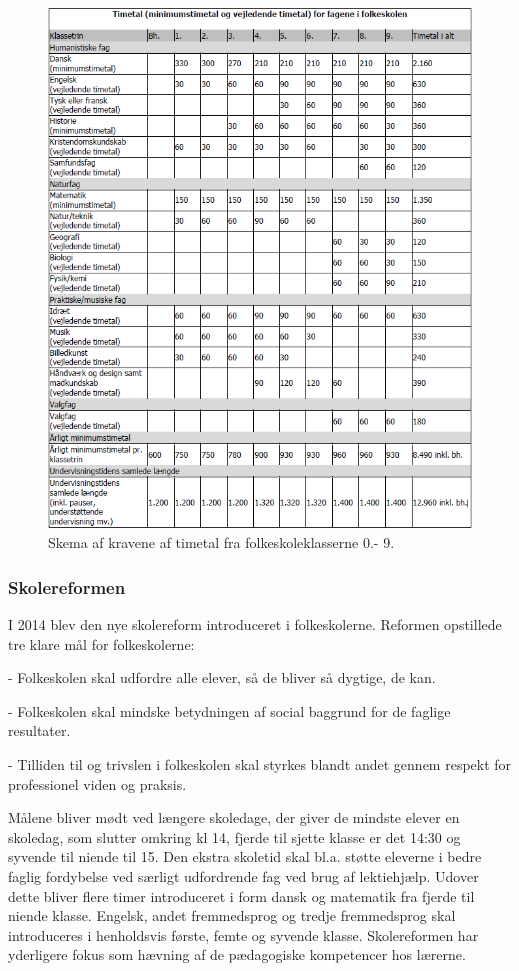 \begin{figure}[!ht]
  \centering
  \includegraphics[width=\textwidth]{partials/graphics/overallskemaovertimetal.png}
  \caption{Skema af kravene af timetal fra folkeskoleklasserne 0.- 9.}
  \label{fig:Timetal}
\end{figure}
 	
\subsubsection{Skolereformen}
I 2014 blev den nye skolereform introduceret i folkeskolerne. Reformen opstillede tre klare mål for folkeskolerne:

-         Folkeskolen skal udfordre alle elever, så de bliver så dygtige, de kan.

-	Folkeskolen skal mindske betydningen af social baggrund for de faglige resultater.

-	Tilliden til og trivslen i folkeskolen skal styrkes blandt andet gennem respekt for professionel viden og praksis.

Målene bliver mødt ved længere skoledage, der giver de mindste elever en skoledag, som slutter omkring kl 14, fjerde til sjette klasse er det  14:30 og syvende til niende til 15. Den ekstra skoletid skal bl.a. støtte eleverne i bedre faglig fordybelse ved særligt udfordrende fag ved brug af lektiehjælp. Udover dette bliver flere timer introduceret i form dansk og matematik fra fjerde til niende klasse. Engelsk, andet fremmedsprog og tredje fremmedsprog skal introduceres i henholdsvis første, femte og syvende klasse.
Skolereformen har yderligere fokus som hævning af de pædagogiske kompetencer hos lærerne.
